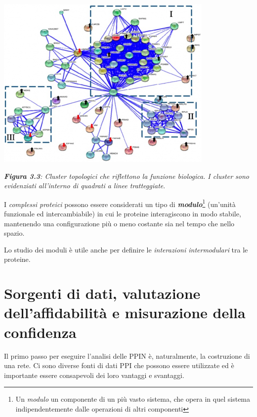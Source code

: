 \documentclass[11pt]{article}
\begin{document}
\begin{center}
\includegraphics[scale=0.7]{grafffo}

\begin{small}\textit{\textbf{Figura 3.3}: Cluster topologici che riflettono la funzione biologica. I cluster sono evidenziati all'interno di quadrati a linee tratteggiate}.\end{small}
\end{center}

I \textit{complessi proteici} possono essere considerati un tipo di \textit{\textbf{modulo}}\footnote{Un \textit{modulo} un componente di un più vasto sistema, che opera in quel sistema indipendentemente dalle operazioni di altri componenti} (un'unità funzionale ed intercambiabile) in cui le proteine interagiscono in modo stabile, mantenendo una configurazione più o meno costante sia nel tempo che nello spazio.

Lo studio dei moduli è utile anche per definire le \textit{interazioni intermodulari} tra le proteine.

\section{Sorgenti di dati, valutazione dell'affidabilità e misurazione della confidenza}
Il primo passo per eseguire l'analisi delle PPIN è, naturalmente, la costruzione di una rete. Ci sono diverse fonti di dati PPI che possono essere utilizzate ed è importante essere consapevoli dei loro vantaggi e svantaggi.
\end{document}
